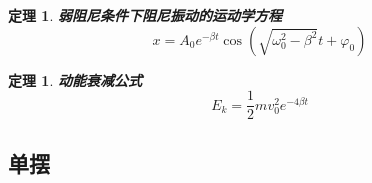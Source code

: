 \documentclass[UTF8]{ctexart}
\newcommand{\<}{\langle}
\renewcommand{\>}{\rangle}                              %
\newenvironment{thm_box}{
    \begin{tcolorbox}[enhanced, colback=thm_blue2, boxrule=0pt, frame hidden,
        borderline west={0.7mm}{0.1mm}{thm_blue1},breakable]
    }
    {\end{tcolorbox}}
\theoremstyle{MyStyle} %
\newtheorem{theorem}[definition]{定理}
\newenvironment{thm}{\begin{thm_box}\begin{theorem}}{\end{theorem}\end{thm_box}}
\begin{document}
            \begin{thm}
                \textbf{弱阻尼条件下阻尼振动的运动学方程}
                \[x=A_0e^{-\beta t}\cos(\sqrt{\omega_0^2-\beta^2}t+\varphi_0)\]
            \end{thm}
            
            \begin{thm}
                \textbf{动能衰减公式}
                \[E_k=\frac{1}{2}mv_0^2 e^{-4\beta t}\]
            \end{thm}

        \subsection{单摆}
    
\end{document}
